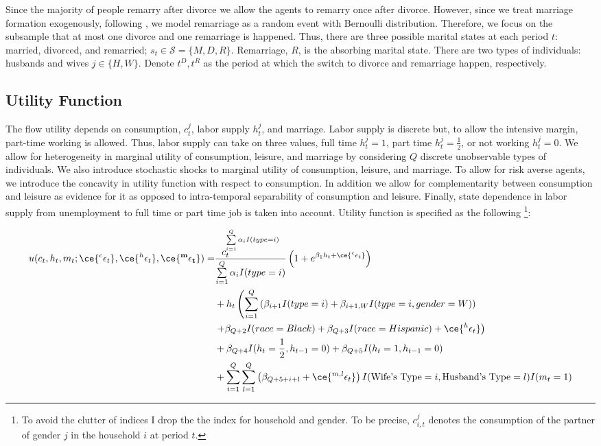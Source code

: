 Since the majority of people remarry after divorce we allow the agents to remarry once after divorce. However, since we treat marriage formation exogenously,  following \citet{Voena_2015}, we model remarriage as a random event with Bernoulli distribution. Therefore, we focus on the subsample that at most one divorce and one remarriage is happened. Thus, there are three possible marital states at each period $t$: married, divorced, and remarried; $s_t \in \mathcal S = \{M, D, R \}$. Remarriage, $R$,  is the absorbing marital state.  There are two types of individuals: husbands and wives $j \in \{ H, W\}$. Denote $t^D, t^R$ as the period at which the switch to divorce and remarriage happen, respectively. \\


\subsection{Utility Function}
The flow utility depends on consumption, $c_t^j$, labor supply $h_t^j$, and marriage. Labor supply is discrete but, to allow the intensive margin, part-time working is allowed. Thus, labor supply can take on three values, full time $h_t^j = 1$,  part time $h_t^j = \frac{1}{2}$, or not working $h_t^j = 0$. We allow for heterogeneity in marginal utility of consumption, leisure, and marriage by considering $Q$ discrete  unobservable types of individuals. We also introduce stochastic shocks to  marginal utility of consumption, leisure, and marriage. To allow for risk averse agents, we introduce the concavity in utility function with respect to consumption. In addition we allow for complementarity between consumption and leisure as evidence for it as opposed to intra-temporal separability of consumption and leisure. Finally, state dependence in labor supply from unemployment to full time or part time job is taken into account.  Utility function is specified as the following \footnote {To avoid the clutter of indices I drop the the index for household and gender. To be precise, $c^j_{i,t}$ denotes the consumption of the partner of gender $j$ in the household $i$ at period $t$. }:
  
\begin{align*}
 u(c_{t}, h_{t}, m_{t}; \ce{^{c}\epsilon_{t}}, \ce{^{h}\epsilon_t}, \ce{^{\mathbf{m}}\mathbf{\epsilon_t}}) = & \dfrac{c_t^{\sum \limits_ {i=1}^{Q} \alpha_iI(type = i)}}{{\sum \limits_ {i=1}^{Q} \alpha_iI(type = i)}} \left (1 + e^{\beta_1 h_t+\ce{^c\epsilon_t}} \right ) \\
& + h_t \left( \sum \limits_{i=1}^{Q} \left( \beta_{i+1} I(type =i) + \beta_{i+1,W}  I(type = i, gender = W)\right) \right. \\
& \left.  + \beta_{Q+2} I(race = Black) + \beta_{Q+3} I(race = Hispanic) +\ce{^h\epsilon_t}  \right) \\
& + \beta_{Q+4} I(h_t =\frac{1}{2}, h_{t-1} = 0) + \beta_{Q+5} I(h_t = 1, h_{t-1} = 0) \\
& + \sum \limits_{i=1}^{Q} \sum \limits_{l=1}^{Q} \left( \beta_{Q+5+i+l} + \ce{^{m,l}\epsilon_t}\right ) I(\text{Wife's Type} = i, \text{Husband's Type} = l) I(m_t = 1)
\end{align*}


